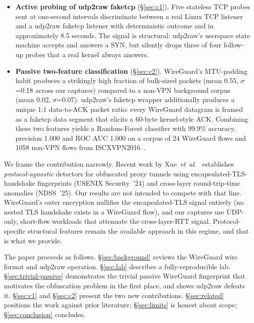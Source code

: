 \documentclass[conference]{IEEEtran}
\begin{document}
\begin{itemize}
  \item \textbf{Active probing of udp2raw faketcp} (\S\ref{sec:c1}). Five
        stateless TCP probes sent at one-second intervals discriminate
        between a real Linux TCP listener and a udp2raw faketcp listener
        with deterministic outcome and in approximately 8.5 seconds. The
        signal is structural: udp2raw's userspace state machine accepts
        and answers a SYN, but silently drops three of four follow-up
        probes that a real kernel always answers.
  \item \textbf{Passive two-feature classification} (\S\ref{sec:c2}).
        WireGuard's MTU-padding habit produces a strikingly high fraction
        of bulk-sized packets (mean 0.55, ${\sigma}$=0.18 across our
        captures) compared to a non-VPN background corpus (mean 0.02,
        ${\sigma}$=0.07). udp2raw's faketcp wrapper additionally produces a
        unique 1:1 data-to-ACK packet ratio: every WireGuard datagram is
        framed as a faketcp data segment that elicits a 60-byte
        kernel-style ACK. Combining these two features yields a
        Random-Forest classifier with 99.9\% accuracy, precision 1.000 and
        ROC AUC 1.000 on a corpus of 24 WireGuard flows and 1058 non-VPN
        flows from ISCXVPN2016~\cite{draper2016iscx}.
\end{itemize}

We frame the contribution narrowly. Recent work by
Xue~\textit{et~al.}~\cite{xue2024obfuscated, xue2025crosslayer} establishes
\emph{protocol-agnostic} detectors for obfuscated proxy tunnels using
encapsulated-TLS-handshake fingerprints (USENIX Security~'24) and
cross-layer round-trip-time anomalies (NDSS~'25). Our results are not
intended to compete with that line. WireGuard's outer encryption nullifies
the encapsulated-TLS signal entirely (no nested TLS handshake exists in a
WireGuard flow), and our captures use UDP-only, short-flow workloads that
attenuate the cross-layer-RTT signal. Protocol-specific structural features
remain the available approach in this regime, and that is what we provide.

The paper proceeds as follows. \S\ref{sec:background} reviews the WireGuard
wire format and udp2raw operation. \S\ref{sec:lab} describes a
fully-reproducible lab. \S\ref{sec:trivial-passive} demonstrates the
trivial passive WireGuard fingerprint that motivates the obfuscation
problem in the first place, and shows udp2raw defeats it. \S\ref{sec:c1}
and \S\ref{sec:c2} present the two new contributions. \S\ref{sec:related}
positions the work against prior literature; \S\ref{sec:limits} is honest
about scope; \S\ref{sec:conclusion} concludes.
\end{document}
